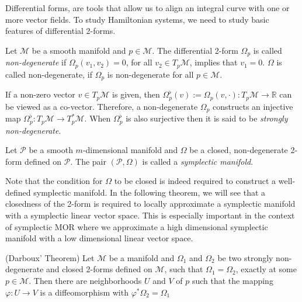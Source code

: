 Differential forms, are tools that allow us to align an integral curve with one or more vector fields. To study Hamiltonian systems, we need to study basic features of differential 2-forms.

\begin{definition}
	Let $\mathcal M$ be a smooth manifold and $p\in \mathcal M$. The differential 2-form $\Omega_p$ is called \emph{non-degenerate} if $\Omega_p(v_1,v_2)=0$, for all $v_2\in T_p \mathcal M$, implies that $v_1 = 0$. $\Omega$ is called non-degenerate, if $\Omega_p$ is non-degenerate for all $p\in \mathcal M$.
\end{definition}
If a non-zero vector $v\in T_p \mathcal M$ is given, then $\Omega_p^{\flat}(v):=\Omega_p(v,\cdot):T_p \mathcal M \to \mathbb R$ can be viewed as a co-vector. Therefore, a non-degenerate $\Omega_p$ constructs an injective map $\Omega_p^{\flat}:T_p\mathcal M \to T_p^* \mathcal M$. When $\Omega_p^{\flat}$ is also surjective then it is said to be \emph{strongly non-degenerate}. 

\begin{definition}
	Let $\mathcal P$ be a smooth $m$-dimensional manifold and $\Omega$ be a closed, non-degenerate 2-form defined on $\mathcal P$. The pair $(\mathcal P,\Omega)$ is called a \emph{symplectic manifold}.
\end{definition}
Note that the condition for $\Omega$ to be closed is indeed required to construct a well-defined symplectic manifold. In the following theorem, we will see that a closedness of the 2-form is required to locally approximate a symplectic manifold with a symplectic linear vector space. This is especially important in the context of symplectic MOR where we approximate a high dimensional symplectic manifold with a low dimensional linear vector space.

\begin{theorem} \label{theorem:2.5}
(Darboux' Theorem) Let $\mathcal M$ be a manifold and $\Omega_1$ and $\Omega_2$ be two strongly non-degenerate and closed 2-forms defined on $\mathcal M$, such that $\Omega_1 = \Omega_2$, exactly at some $p\in \mathcal M$. Then there are neighborhoods $U$ and $V$ of $p$ such that the mapping $\varphi:U\to V$ is a diffeomorphism with $\varphi^* \Omega_2 = \Omega_1$
\end{theorem}

